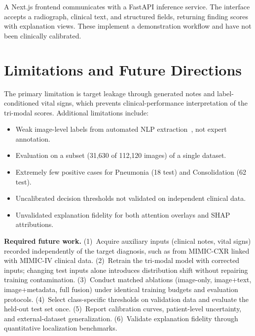 \documentclass[runningheads,a4paper]{llncs}
\begin{document}
A Next.js frontend communicates with a FastAPI inference service.
The interface accepts a radiograph, clinical text, and structured fields, returning finding scores with explanation views.
These implement a demonstration workflow and have not been clinically calibrated.

\section{Limitations and Future Directions}

The primary limitation is target leakage through generated notes and label-conditioned vital signs, which prevents clinical-performance interpretation of the tri-modal scores.
Additional limitations include:

\begin{itemize}
\item Weak image-level labels from automated NLP extraction~\cite{wang2017}, not expert annotation.
\item Evaluation on a subset (31{,}630 of 112{,}120 images) of a single dataset.
\item Extremely few positive cases for Pneumonia (18 test) and Consolidation (62 test).
\item Uncalibrated decision thresholds not validated on independent clinical data.
\item Unvalidated explanation fidelity for both attention overlays and SHAP attributions.
\end{itemize}

\textbf{Required future work.}
(1)~Acquire auxiliary inputs (clinical notes, vital signs) recorded independently of the target diagnosis, such as from MIMIC-CXR linked with MIMIC-IV clinical data.
(2)~Retrain the tri-modal model with corrected inputs; changing test inputs alone introduces distribution shift without repairing training contamination.
(3)~Conduct matched ablations (image-only, image+text, image+metadata, full fusion) under identical training budgets and evaluation protocols.
(4)~Select class-specific thresholds on validation data and evaluate the held-out test set once.
(5)~Report calibration curves, patient-level uncertainty, and external-dataset generalization.
(6)~Validate explanation fidelity through quantitative localization benchmarks.

\end{document}
